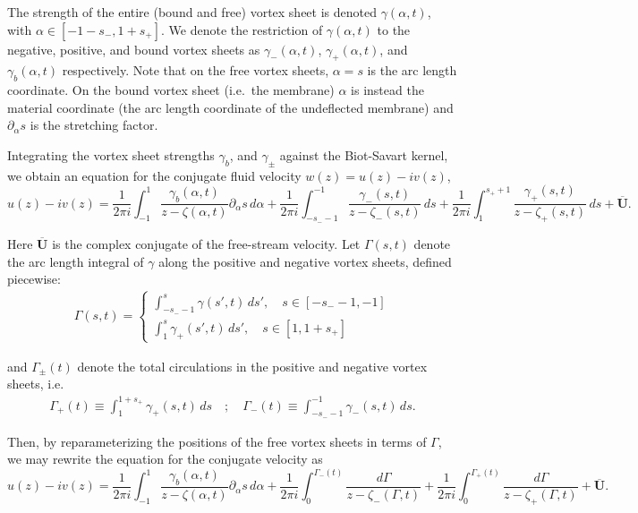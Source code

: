 \documentclass{article}[12pt]
\theoremstyle{Theorem}
\begin{document}
The strength of the entire (bound and free) vortex sheet is denoted $\gamma(\alpha, t)$, with $\alpha \in[-1 -s_-, 1 + s_+]$. We denote the restriction of $\gamma(\alpha, t)$ to the negative, positive, and bound vortex sheets as $\gamma_-(\alpha, t)$, $\gamma_+(\alpha, t)$, and $\gamma_b(\alpha, t)$ respectively. Note that on the free vortex sheets, $\alpha = s$ is the arc length coordinate. On the bound vortex sheet (i.e.~the membrane) $\alpha$ is instead the material coordinate (the arc length coordinate of the undeflected membrane) and $\partial_\alpha s$ is the stretching factor.
\newline


Integrating the vortex sheet strengths $\gamma_b$, and $\gamma_\pm$ against the Biot-Savart kernel, we obtain an equation for the conjugate fluid velocity  $w(z) = u(z) - iv(z)$,
 \begin{equation}
    u(z) - i v(z) = \frac{1}{2\pi i}\int_{-1}^{1}{\frac{\gamma_b(\alpha, t)}{z - \zeta(\alpha, t)}\partial_\alpha s\,  d\alpha}  +\frac{1}{2\pi i}\int_{-s_{-} -1}^{-1}{\frac{\gamma_{-}(s,t)}{z - \zeta_{-}(s,t)}\, ds} + \frac{1}{2\pi i}\int_{1}^{s_{+} + 1}{\frac{\gamma_{+}(s,t)}{z - \zeta_{+}(s,t)}\, ds} + \overline{\boldsymbol{U}}.
\end{equation}

Here $\overline{\boldsymbol{U}}$ is the complex conjugate of the free-stream velocity. Let $\Gamma(s,t)$ denote the arc length integral of $\gamma$ along the positive and negative vortex sheets, defined piecewise:
\begin{align}
\Gamma(s,t) = \begin{cases}
    \int_{-s_--1}^s \gamma(s',t)\,ds', \quad s \in [-s_--1, -1] \\
   \int_{1}^{s}\gamma_+(s',t)\,ds', \quad s \in [1, 1+s_+]
\end{cases} 
\end{align}

and $\Gamma_\pm(t)$ denote the total circulations in the positive and negative vortex sheets, i.e.
\begin{align}
\Gamma_+(t) \equiv \int_{1}^{1+s_{+}}\gamma_{+}(s,t)\, ds \quad ; \quad \Gamma_-(t) \equiv \int_{-s_{-}-1}^{-1}\gamma_{-}(s,t)\, ds.
\end{align}

Then, by reparameterizing the positions of the free vortex sheets in terms of $\Gamma$, we may rewrite the equation for the conjugate velocity as
\begin{equation}
     u(z) - i v(z) = \frac{1}{2\pi i}\int_{-1}^{1}{\frac{\gamma_b(\alpha, t)}{z - \zeta(\alpha, t)}\partial_\alpha s\,  d\alpha}  + \frac{1}{2\pi i}\int_{0}^{\Gamma_-(t)}{\frac{d\Gamma}{z - \zeta_{-}(\Gamma,t)}} + \frac{1}{2\pi i}\int_{0}^{\Gamma_+(t)}{\frac{d\Gamma}{z - \zeta_{+}(\Gamma,t)}}+ \overline{\boldsymbol{U}}. \label{ConjFluidVel}
\end{equation}
\end{document}
